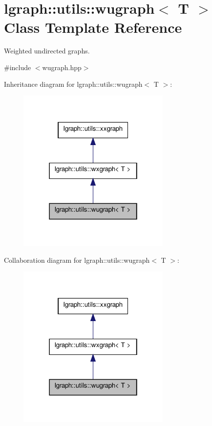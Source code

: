 \hypertarget{classlgraph_1_1utils_1_1wugraph}{\section{lgraph\-:\-:utils\-:\-:wugraph$<$ T $>$ Class Template Reference}
\label{classlgraph_1_1utils_1_1wugraph}
}


Weighted undirected graphs.  




{\ttfamily \#include $<$wugraph.\-hpp$>$}



Inheritance diagram for lgraph\-:\-:utils\-:\-:wugraph$<$ T $>$\-:\nopagebreak
\begin{figure}[H]
\begin{center}
\leavevmode
\includegraphics[width=214pt]{classlgraph_1_1utils_1_1wugraph__inherit__graph}
\end{center}
\end{figure}


Collaboration diagram for lgraph\-:\-:utils\-:\-:wugraph$<$ T $>$\-:\nopagebreak
\begin{figure}[H]
\begin{center}
\leavevmode
\includegraphics[width=214pt]{classlgraph_1_1utils_1_1wugraph__coll__graph}
\end{center}
\end{figure}
